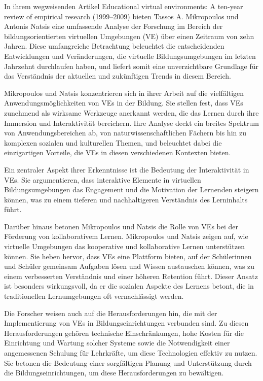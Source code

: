 \documentclass[draft]{vutinfth} %
\begin{document}
In ihrem wegweisenden Artikel \glqq Educational virtual environments: A ten-year review of empirical research (1999--2009)\grqq \cite{mikropoulos2011educational} bieten Tassos A. Mikropoulos und Antonis Natsis eine umfassende Analyse der Forschung im Bereich der bildungsorientierten virtuellen Umgebungen (VE) über einen Zeitraum von zehn Jahren. Diese umfangreiche Betrachtung beleuchtet die entscheidenden Entwicklungen und Veränderungen, die virtuelle Bildungsumgebungen im letzten Jahrzehnt durchlaufen haben, und liefert somit eine unverzichtbare Grundlage für das Verständnis der aktuellen und zukünftigen Trends in diesem Bereich.

Mikropoulos und Natsis konzentrieren sich in ihrer Arbeit auf die vielfältigen Anwendungsmöglichkeiten von VEs in der Bildung. Sie stellen fest, dass VEs zunehmend als wirksame Werkzeuge anerkannt werden, die das Lernen durch ihre Immersion und Interaktivität bereichern. Ihre Analyse deckt ein breites Spektrum von Anwendungsbereichen ab, von naturwissenschaftlichen Fächern bis hin zu komplexen sozialen und kulturellen Themen, und beleuchtet dabei die einzigartigen Vorteile, die VEs in diesen verschiedenen Kontexten bieten.

Ein zentraler Aspekt ihrer Erkenntnisse ist die Bedeutung der Interaktivität in VEs. Sie argumentieren, dass interaktive Elemente in virtuellen Bildungsumgebungen das Engagement und die Motivation der Lernenden steigern können, was zu einem tieferen und nachhaltigeren Verständnis des Lerninhalts führt.

Darüber hinaus betonen Mikropoulos und Natsis die Rolle von VEs bei der Förderung von kollaborativem Lernen. Mikropoulos und Natsis zeigen auf, wie virtuelle Umgebungen das kooperative und kollaborative Lernen unterstützen können. Sie heben hervor, dass VEs eine Plattform bieten, auf der Schülerinnen und Schüler gemeinsam Aufgaben lösen und Wissen austauschen können, was zu einem verbesserten Verständnis und einer höheren Retention führt. Dieser Ansatz ist besonders wirkungsvoll, da er die sozialen Aspekte des Lernens betont, die in traditionellen Lernumgebungen oft vernachlässigt werden.

Die Forscher weisen auch auf die Herausforderungen hin, die mit der Implementierung von VEs in Bildungseinrichtungen verbunden sind. Zu diesen Herausforderungen gehören technische Einschränkungen, hohe Kosten für die Einrichtung und Wartung solcher Systeme sowie die Notwendigkeit einer angemessenen Schulung für Lehrkräfte, um diese Technologien effektiv zu nutzen. Sie betonen die Bedeutung einer sorgfältigen Planung und Unterstützung durch die Bildungseinrichtungen, um diese Herausforderungen zu bewältigen.
\end{document}
